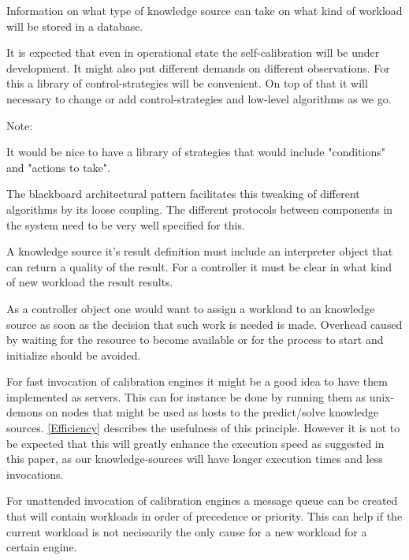 \documentclass[]{lofar}
\begin{document}
    Information on what type of knowledge source can take on what kind
    of workload will be stored in a database.

    It is expected that even in operational state the self-calibration
    will be under development. It might also put different demands on
    different observations. For this a library of control-strategies
    will be convenient. On top of that it will necessary to change or
    add control-strategies and low-level algorithms as we go.

    \begin{em}\large{Note: }

      It would be nice to have a library of strategies that would
      include "conditions" and "actions to take".

    \end{em}

    The blackboard architectural pattern facilitates this tweaking of
    different algorithms by its loose coupling. The different
    protocols between components in the system need to be very well
    specified for this.

    A knowledge source it's result definition must include an
    interpreter object that can return a quality of the result. For a
    controller it must be clear in what kind of new workload the
    result results.

    As a controller object one would want to assign a workload to an
    knowledge source as soon as the decision that such work is needed
    is made. Overhead caused by waiting for the resource to become
    available or for the process to start and initialize should be
    avoided.

    For fast invocation of calibration engines it might be a good
    idea to have them implemented as servers. This can for instance be
    done by running them as unix-demons on nodes that might be used as
    hosts to the predict/solve knowledge
    sources. \hyperlink{bib-Efficiency}{[Efficiency]} describes the
    usefulness of this principle. However it is not to be expected
    that this will greatly enhance the execution speed as suggested in
    this paper, as our knowledge-sources will have longer execution
    times and less invocations.

    For unattended invocation of calibration engines a message queue
    can be created that will contain workloads in order of precedence
    or priority. This can help if the current workload is not
    necissarily the only cause for a new workload for a certain
    engine.
\end{document}
